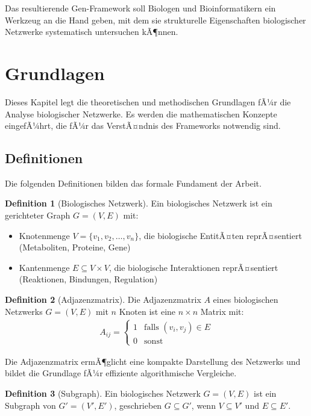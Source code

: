 ﻿\documentclass[a4paper,12pt]{article}
\theoremstyle{definition}
\newtheorem{definition}{Definition}
\begin{document}
Das resultierende Gen-Framework soll Biologen und Bioinformatikern ein Werkzeug an die Hand geben, mit dem sie strukturelle Eigenschaften biologischer Netzwerke systematisch untersuchen kÃ¶nnen.

\section{Grundlagen}

Dieses Kapitel legt die theoretischen und methodischen Grundlagen fÃ¼r die Analyse biologischer Netzwerke. Es werden die mathematischen Konzepte eingefÃ¼hrt, die fÃ¼r das VerstÃ¤ndnis des Frameworks notwendig sind.

\subsection{Definitionen}

Die folgenden Definitionen bilden das formale Fundament der Arbeit.

\begin{definition}[Biologisches Netzwerk]
	Ein biologisches Netzwerk ist ein gerichteter Graph $G = (V, E)$ mit:
	\begin{itemize}
		\item[-] Knotenmenge $V = \{v_1, v_2, \ldots, v_n\}$, die biologische EntitÃ¤ten reprÃ¤sentiert (Metaboliten, Proteine, Gene)
		\item[-] Kantenmenge $E \subseteq V \times V$, die biologische Interaktionen reprÃ¤sentiert (Reaktionen, Bindungen, Regulation)
	\end{itemize}
\end{definition}

\begin{definition}[Adjazenzmatrix]
	Die Adjazenzmatrix $A$ eines biologischen Netzwerks $G = (V, E)$ mit $n$ Knoten ist eine $n \times n$ Matrix mit:
	\begin{align}
		A_{ij} = \begin{cases}
			1 & \text{falls } (v_i, v_j) \in E \\
			0 & \text{sonst}
		\end{cases}
	\end{align}
\end{definition}

Die Adjazenzmatrix ermÃ¶glicht eine kompakte Darstellung des Netzwerks und bildet die Grundlage fÃ¼r effiziente algorithmische Vergleiche.

\begin{definition}[Subgraph]
	Ein biologisches Netzwerk $G = (V, E)$ ist ein Subgraph von $G' = (V', E')$, geschrieben $G \subseteq G'$, wenn $V \subseteq V'$ und $E \subseteq E'$.
\end{definition}
\end{document}
